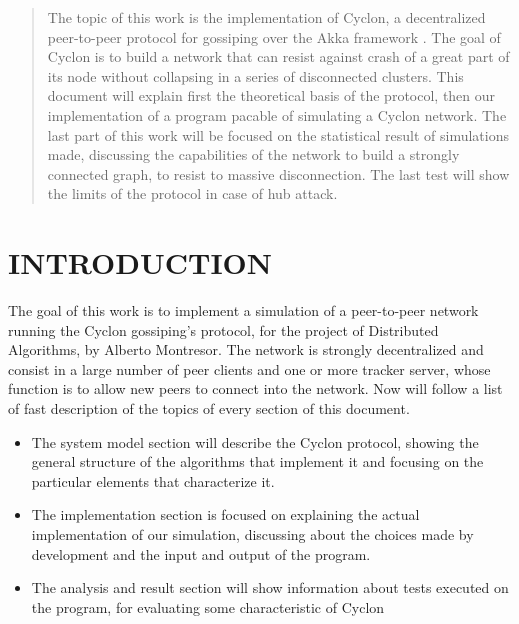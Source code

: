 \documentclass[a4paper,12pt,notitlepage]{article} %
\begin{document}

\begin{abstract}
   	 	
    The topic of this work is the implementation of Cyclon, a decentralized
    peer-to-peer protocol for gossiping over the Akka framework \cite{Akka}.
    The goal of Cyclon is to build a network that can resist against crash of 
    a great part of its node without  collapsing in a series of disconnected clusters.
    This document will explain first the theoretical basis of the protocol, then 
    our implementation of a program pacable of simulating a Cyclon network. 
    The last part of this work will be focused on the statistical
    result of simulations made, discussing the capabilities of the network
    to build a strongly connected graph, to resist to massive disconnection. The 
    last test will show the limits of the protocol in case of hub attack.
  

\end{abstract}
\newpage



\section{INTRODUCTION}

The goal of this work is to implement a simulation of a peer-to-peer network running
 the Cyclon gossiping's protocol, for the project of Distributed Algorithms, by Alberto Montresor. 
 The network is strongly decentralized and consist in a 
 large number of peer clients and one or more tracker server, whose function is to allow new 
 peers to connect into the network. Now will follow a list of fast description of the topics of every
 section of this document.

 \begin{itemize}
 	\item The system model section will describe the Cyclon protocol, showing  the general structure of 
 	the algorithms that implement it and focusing on the particular elements that characterize it.
 	\item The implementation section is focused on explaining the actual implementation of 
 	our simulation, discussing about the choices made by development and the input and
 	 output of the program.
 	\item The analysis and result section will show information about tests executed on 
 	the program, for evaluating some characteristic of Cyclon
 \end{itemize}
\end{document}
